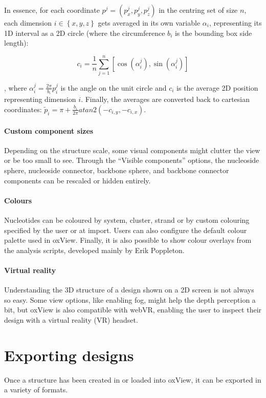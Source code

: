 In essence, for each coordinate \(p^j = \left(p_x^j, p_y^j, p_z^j\right) \) in the centring set of size \(n\), each dimension \(i \in \left\{x,y,z\right\}\) gets averaged in its own variable \(\alpha_i\), representing its 1D interval as a 2D circle (where the circumference \(b_i\) is the bounding box side length):

\[
  c_i = \frac{1}{n} \sum_{j = 1}^{n} \left[ \cos \left( \alpha_i^j \right), \sin \left( \alpha_i^j \right) \right]
\]

, where \(\alpha_i^j = \frac{2 \pi}{b_i} p_i^j\) is the angle on the unit circle and \(c_i\) is the average 2D position representing dimension \(i\). Finally, the averages are converted back to cartesian coordinates: 
\(
  \widetilde{p}_i = \pi + \frac{b_i}{2\pi} atan2(-c_{i,y}, -c_{i, x})
\).

\paragraph{Custom component sizes} Depending on the structure scale, some visual components might clutter the view or be too small to see. Through the ``Visible components'' options, the nucleoside sphere, nucleoside connector, backbone sphere, and backbone connector components can be rescaled or hidden entirely.

\paragraph{Colours} Nucleotides can be coloured by system, cluster, strand or by custom colouring specified by the user or at import. Users can also configure the default colour palette used in oxView. Finally, it is also possible to show colour overlays from the analysis scripts, developed mainly by Erik Poppleton. 

\paragraph{Virtual reality} Understanding the 3D structure of a design shown on a 2D screen is not always so easy. Some view options, like enabling fog, might help the depth perception a bit, but oxView is also compatible with webVR, enabling the user to inspect their design with a virtual reality (VR) headset. 

\section{Exporting designs}
\label{sec:oxdna_export}
Once a structure has been created in or loaded into oxView, it can be exported in a variety of formats.

